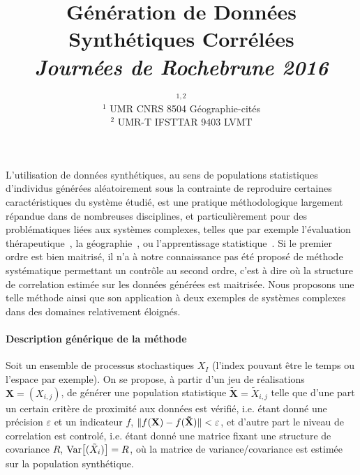 


\title{\vspace{-1cm}Génération de Données Synthétiques Corrélées\\\medskip
\textit{Journées de Rochebrune 2016}
}
\author{$^{1,2}$\\
$^{1}$ UMR CNRS 8504 Géographie-cités\\
$^{2}$ UMR-T IFSTTAR 9403 LVMT
}
\date{}


\maketitle

\justify


L'utilisation de données synthétiques, au sens de populations statistiques d'individus générées aléatoirement sous la contrainte de reproduire certaines caractéristiques du système étudié, est une pratique méthodologique largement répandue dans de nombreuses disciplines, et particulièrement pour des problématiques liées aux systèmes complexes, telles que par exemple l'évaluation thérapeutique~\cite{abadie2010synthetic}, la géographie~\cite{moeckel2003creating}, ou l'apprentissage statistique~\cite{bolon2013review}. Si le premier ordre est bien maitrisé, il n'a à notre connaissance pas été proposé de méthode systématique permettant un contrôle au second ordre, c'est à dire où la structure de correlation estimée sur les données générées est maitrisée. Nous proposons une telle méthode ainsi que son application à deux exemples de systèmes complexes dans des domaines relativement éloignés.

\vspace{-0.4cm}
\paragraph{Description générique de la méthode}

Soit un ensemble de processus stochastiques $X_I$ (l'index pouvant être le temps ou l'espace par exemple). On se propose, à partir d'un jeu de réalisations $\mathbf{X}=(X_{i,j})$, de générer une population statistique $\mathbf{\tilde{X}}=\tilde{X}_{i,j}$ telle que d'une part un certain critère de proximité aux données est vérifié, i.e. étant donné une précision $\varepsilon$ et un indicateur $f$, $\| f(\mathbf{X})-f(\mathbf{\tilde{X}}) \| < \varepsilon$, et d'autre part le niveau de correlation est controlé, i.e. étant donné une matrice fixant une structure de covariance $R$, $\operatorname{Var}\!\left[(\tilde{X}_i)\right] = R$, où la matrice de variance/covariance est estimée sur la population synthétique.


